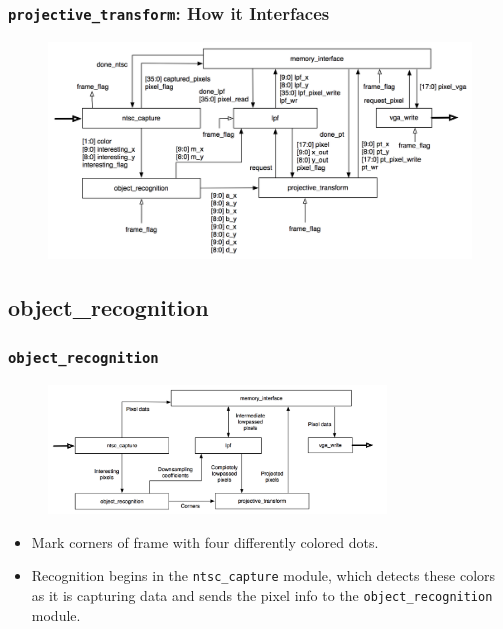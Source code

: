 \documentclass{beamer}
\begin{document}
\begin{frame}
	\frametitle{{\tt projective\_transform}: How it Interfaces}
	\begin{figure}
		\centering
		\includegraphics[width=\textwidth]{../proposal/block_diagram_with_wires.png}
	\end{figure}
\end{frame}

\subsection{object\_recognition}


\begin{frame}
	\frametitle{{\tt object\_recognition}}

	\begin{figure}
		\centering
		\includegraphics[width=0.8\textwidth]{../proposal/simplified_block_diagram.png}
	\end{figure}
	
	\begin{itemize}
		\item Mark corners of frame with four differently colored dots.
		\item Recognition begins in the {\tt ntsc\_capture} module, which detects these colors as it is capturing data and sends the pixel info to the {\tt object\_recognition} module.
		
	\end{itemize}
\end{frame}
\end{document}
